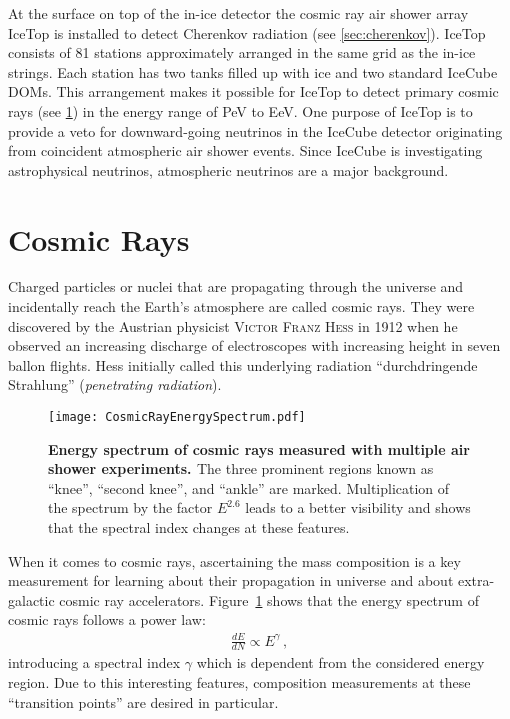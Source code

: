 At the surface on top of the in-ice detector the cosmic ray air shower array IceTop is installed to detect Cherenkov radiation (see \ref{sec:cherenkov}). IceTop consists of 81 stations approximately arranged in the same grid as the in-ice strings. Each station has two tanks filled up with ice and two standard IceCube DOMs. This arrangement makes it possible for IceTop to detect primary cosmic rays (see \ref{sec:cosmicrays}) in the energy range of \si{\peta\electronvolt} to \si{\exa\electronvolt}. One purpose of IceTop is to provide a veto for downward-going neutrinos in the IceCube detector originating from coincident atmospheric air shower events. \cite{icecube:instrumentation} Since IceCube is investigating astrophysical neutrinos, atmospheric neutrinos are a major background.

\section{Cosmic Rays}\label{sec:cosmicrays}

Charged particles or nuclei that are propagating through the universe and incidentally reach the Earth's atmosphere are called cosmic rays. They were discovered by the Austrian physicist \textsc{Victor Franz Hess} in 1912 when he observed an increasing discharge of electroscopes with increasing height in seven ballon flights. \cite{cosmicrays:hess} Hess initially called this underlying radiation \enquote{durchdringende Strahlung} (\textit{penetrating radiation}).

\begin{figure}[h]
	\texttt{[image: CosmicRayEnergySpectrum.pdf]}
	\caption[Cosmic ray energy spectrum]{\textbf{Energy spectrum of cosmic rays measured with multiple air shower experiments. \cite[adapted]{cosmicrays:gaisser}} The three prominent regions known as \enquote{knee}, \enquote{second knee}, and \enquote{ankle} are marked. Multiplication of the spectrum by the factor $E^{2.6}$ leads to a better visibility and shows that the spectral index changes at these features.}
	\label{cosmicrays:spectrum}	
\end{figure}

When it comes to cosmic rays, ascertaining the mass composition is a key measurement for learning about their propagation in universe and about extra-galactic cosmic ray accelerators. Figure~\ref{cosmicrays:spectrum} shows that the energy spectrum of cosmic rays follows a power law:
\begin{align}
\frac{dE}{dN}\propto E^\gamma\,,
\end{align}
introducing a spectral index $\gamma$ which is dependent from the considered energy region.
Due to this interesting features, composition measurements at these \enquote{transition points} are desired in particular.

